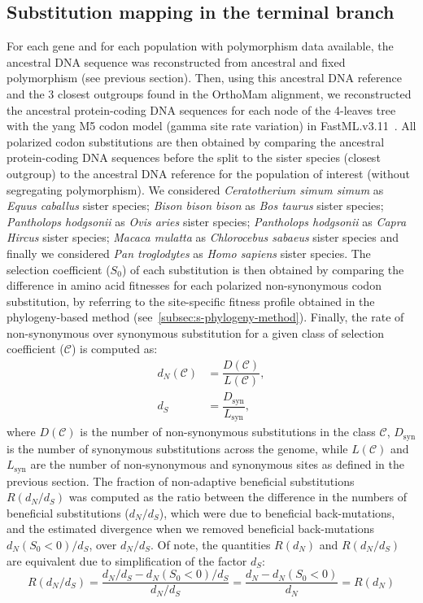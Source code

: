 \documentclass{article}
\newcommand{\dn}{d_N}
\newcommand{\ds}{d_S}
\newcommand{\dnds}{\dn / \ds}
\newcommand{\Sphy}{S_{0}}
\newcommand{\Sphyclass}{\mathcal{C}}
\begin{document}
    \subsection*{Substitution mapping in the terminal branch}
    \label{subsec:substitution-mapping-in-the-terminal-branch}
    For each gene and for each population with polymorphism data available, the ancestral DNA sequence was reconstructed from ancestral and fixed polymorphism (see previous section).
    Then, using this ancestral DNA reference and the $3$ closest outgroups found in the OrthoMam alignment, we reconstructed the ancestral protein-coding DNA sequences for each node of the 4-leaves tree with the yang M5 codon model (gamma site rate variation) in FastML.v3.11~\cite{ashkenazy_fastml_2012}.
    All polarized codon substitutions are then obtained by comparing the ancestral protein-coding DNA sequences before the split to the sister species (closest outgroup) to the ancestral DNA reference for the population of interest (without segregating polymorphism).
    We considered \textit{Ceratotherium simum simum} as \textit{Equus caballus} sister species; \textit{Bison bison bison} as \textit{Bos taurus} sister species; \textit{Pantholops hodgsonii} as \textit{Ovis aries} sister species; \textit{Pantholops hodgsonii} as \textit{Capra Hircus} sister species; \textit{Macaca mulatta} as \textit{Chlorocebus sabaeus} sister species and finally we considered \textit{Pan troglodytes} as \textit{Homo sapiens} sister species.
    The selection coefficient ($\Sphy$) of each substitution is then obtained by comparing the difference in amino acid fitnesses for each polarized non-synonymous codon substitution, by referring to the site-specific fitness profile obtained in the phylogeny-based method (see~\ref{subsec:s-phylogeny-method}).
    Finally, the rate of non-synonymous over synonymous substitution for a given class of selection coefficient ($\Sphyclass$) is computed as:
    \begin{align}
        \dn \left( \Sphyclass \right) &= \dfrac{D\left( \Sphyclass \right)}{L \left( \Sphyclass \right)}, \\
        \ds &= \dfrac{D_{\textrm{syn}}}{L_{\textrm{syn}}},
    \end{align}
    where $D \left( \Sphyclass \right) $ is the number of non-synonymous substitutions in the class $\Sphyclass$, $D_{\textrm{syn}}$ is the number of synonymous substitutions across the genome, while $L \left( \Sphyclass \right)$ and $L_{\textrm{syn}}$ are the number of non-synonymous and synonymous sites as defined in the previous section.
    The fraction of non-adaptive beneficial substitutions $R(\dnds)$ was computed as the ratio between the difference in the numbers of beneficial substitutions ($\dnds$), which were due to beneficial back-mutations, and the estimated divergence when we removed beneficial back-mutations $\dn (\Sphy < 0) / \ds$, over $\dnds$.
    Of note, the quantities $R(\dn)$ and $R(\dnds)$ are equivalent due to simplification of the factor $\ds$:
    \begin{equation}
        R(\dnds) = \dfrac{\dnds - \dn(\Sphy < 0) / \ds}{\dnds} = \dfrac{\dn - \dn(\Sphy < 0)}{\dn} = R(\dn)
    \end{equation}

    \printbibliography
\end{document}
